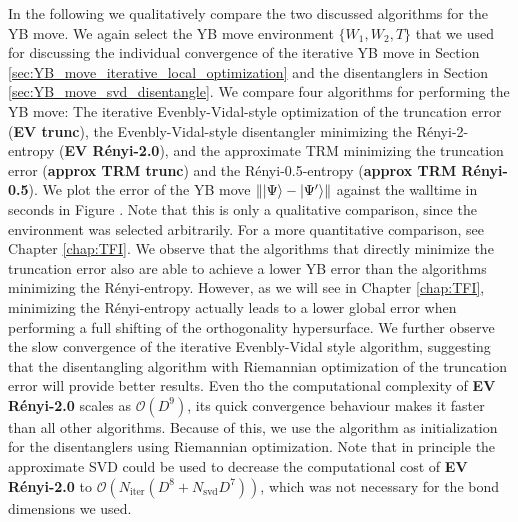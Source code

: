 
In the following we qualitatively compare the two discussed algorithms for the YB move. We again select the YB move environment $\{W_1,W_2, T\}$ that we used for discussing the individual convergence of the iterative YB move in Section \ref{sec:YB_move_iterative_local_optimization} and the disentanglers in Section \ref{sec:YB_move_svd_disentangle}. We compare four algorithms for performing the YB move: The iterative Evenbly-Vidal-style optimization of the truncation error (\textbf{EV trunc}), the Evenbly-Vidal-style disentangler minimizing the Rényi-2-entropy (\textbf{EV Rényi-2.0}), and the approximate TRM minimizing the truncation error (\textbf{approx TRM trunc}) and the Rényi-0.5-entropy (\textbf{approx TRM Rényi-0.5}). We plot the error of the YB move $\lVert\ket{\Psi}-\ket{\Psi^\prime}\rVert$ against the walltime in seconds in Figure . Note that this is only a qualitative comparison, since the environment was selected arbitrarily. For a more quantitative comparison, see Chapter \ref{chap:TFI}. We observe that the algorithms that directly minimize the truncation error also are able to achieve a lower YB error than the algorithms minimizing the Rényi-entropy. However, as we will see in Chapter \ref{chap:TFI}, minimizing the Rényi-entropy actually leads to a lower global error when performing a full shifting of the orthogonality hypersurface. We further observe the slow convergence of the iterative Evenbly-Vidal style algorithm, suggesting that the disentangling algorithm with Riemannian optimization of the truncation error will provide better results. Even tho the computational complexity of \textbf{EV Rényi-2.0} scales as $\mathcal{O}(D^9)$, its quick convergence behaviour makes it faster than all other algorithms. Because of this, we use the algorithm as initialization for the disentanglers using Riemannian optimization. Note that in principle the approximate SVD could be used to decrease the computational cost of \textbf{EV Rényi-2.0} to $\mathcal{O}(N_\text{iter}(D^8 + N_\text{svd} D^7))$, which was not necessary for the bond dimensions we used.